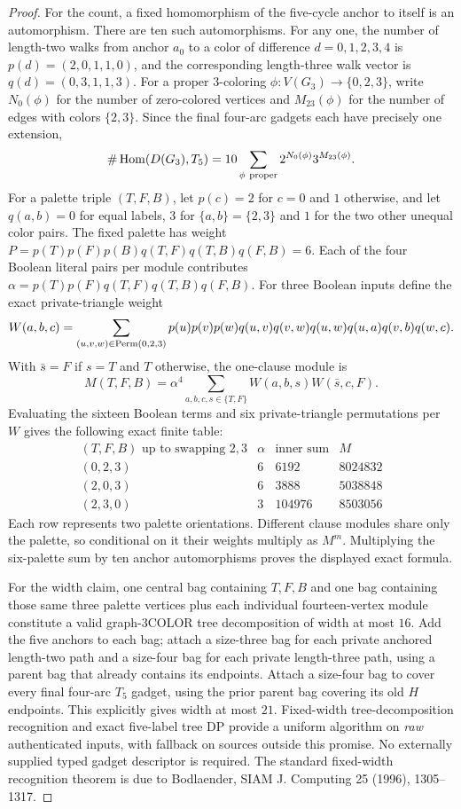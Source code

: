 \documentclass[11pt]{article}
\begin{document}
\begin{proof}
For the count, a fixed homomorphism of the five-cycle anchor to
itself is an automorphism. There are ten such automorphisms.
For any one, the number of length-two walks from anchor $a_0$
to a color of difference $d=0,1,2,3,4$ is
$p(d)=(2,0,1,1,0)$, and the corresponding length-three
walk vector is $q(d)=(0,3,1,1,3)$.
For a proper $3$-coloring
$\phi:V(G_3)\to\{0,2,3\}$, write $N_0(\phi)$ for the
number of zero-colored vertices and $M_{23}(\phi)$ for the
number of edges with colors $\{2,3\}$. Since the final
four-arc gadgets each have precisely one extension,
\[
 \#\operatorname{Hom}(D(G_3),T_5)=
 10\sum_{\phi\ {\rm proper}}
           2^{N_0(\phi)}3^{M_{23}(\phi)}.
\]
For a palette triple $(T,F,B)$, let
$p(c)=2$ for $c=0$ and $1$ otherwise, and let
$q(a,b)=0$ for equal labels, $3$ for $\{a,b\}=\{2,3\}$
and $1$ for the two other unequal color pairs.
The fixed palette has weight
$P=p(T)p(F)p(B)q(T,F)q(T,B)q(F,B)=6$.
Each of the four Boolean literal pairs per module contributes
$\alpha=p(T)p(F)q(T,F)q(T,B)q(F,B)$.
For three Boolean inputs define the exact private-triangle weight
\[
 W(a,b,c)=\sum_{(u,v,w)\in{\rm Perm}(0,2,3)}
 p(u)p(v)p(w)q(u,v)q(v,w)q(u,w)
 q(u,a)q(v,b)q(w,c).
\]
With $\bar s=F$ if $s=T$ and $T$ otherwise, the
one-clause module is
\[
 M(T,F,B)=\alpha^4
 \sum_{a,b,c,s\in\{T,F\}}
       W(a,b,s)W(\bar s,c,F).
\]
Evaluating the sixteen Boolean terms and six private-triangle
permutations per $W$ gives the following exact finite table:
\[
\begin{array}{c|r|r|r}
 (T,F,B)\text{ up to swapping }2,3 & \alpha
 &\text{inner sum}&M\\ \hline
 (0,2,3)&6&6192&8024832\\
 (2,0,3)&6&3888&5038848\\
 (2,3,0)&3&104976&8503056
\end{array}
\]
Each row represents two palette orientations. Different clause
modules share only the palette, so conditional on it their
weights multiply as $M^m$. Multiplying the six-palette sum
by ten anchor automorphisms proves the displayed exact formula.

For the width claim, one central bag containing $T,F,B$ and
one bag containing those same three palette vertices plus each
individual fourteen-vertex module constitute a valid graph-3COLOR
tree decomposition of width at most $16$.
Add the five anchors to each bag; attach a size-three bag
for each private anchored length-two path and a size-four bag
for each private length-three path, using a parent bag that
already contains its endpoints. Attach a size-four bag to
cover every final four-arc $T_5$ gadget, using the prior
parent bag covering its old $H$ endpoints. This explicitly
gives width at most $21$.
Fixed-width tree-decomposition recognition and exact five-label
tree DP provide a uniform algorithm on \emph{raw} authenticated
inputs, with fallback on sources outside this promise.
No externally supplied typed gadget descriptor is required.
The standard fixed-width recognition theorem is due to
Bodlaender, SIAM J. Computing 25 (1996), 1305--1317.
\end{proof}
\end{document}
